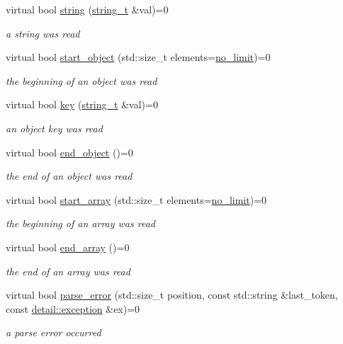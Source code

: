 \begin{DoxyCompactItemize}
virtual bool \mbox{\hyperlink{structnlohmann_1_1json__sax_a07eab82f6c82d606787eee9ad73d2bda}{string}} (\mbox{\hyperlink{structnlohmann_1_1json__sax_ae01977a9f3c5b3667b7a2929ed91061e}{string\+\_\+t}} \&val)=0
\begin{DoxyCompactList}\small\item\em a string was read \end{DoxyCompactList}\item 
virtual bool \mbox{\hyperlink{structnlohmann_1_1json__sax_a447db60efaabc614492c449e640719cf}{start\+\_\+object}} (std\+::size\+\_\+t elements=\mbox{\hyperlink{structnlohmann_1_1json__sax_a84031c6bbd5b85ec13da024fe9e2b9c9}{no\+\_\+limit}})=0
\begin{DoxyCompactList}\small\item\em the beginning of an object was read \end{DoxyCompactList}\item 
virtual bool \mbox{\hyperlink{structnlohmann_1_1json__sax_a2e0c7ecd80b18d18a8cc76f71cfc2028}{key}} (\mbox{\hyperlink{structnlohmann_1_1json__sax_ae01977a9f3c5b3667b7a2929ed91061e}{string\+\_\+t}} \&val)=0
\begin{DoxyCompactList}\small\item\em an object key was read \end{DoxyCompactList}\item 
virtual bool \mbox{\hyperlink{structnlohmann_1_1json__sax_ad0c722d53ff97be700ccf6a9468bd456}{end\+\_\+object}} ()=0
\begin{DoxyCompactList}\small\item\em the end of an object was read \end{DoxyCompactList}\item 
virtual bool \mbox{\hyperlink{structnlohmann_1_1json__sax_aa7717e96a46e41984260ebabab262369}{start\+\_\+array}} (std\+::size\+\_\+t elements=\mbox{\hyperlink{structnlohmann_1_1json__sax_a84031c6bbd5b85ec13da024fe9e2b9c9}{no\+\_\+limit}})=0
\begin{DoxyCompactList}\small\item\em the beginning of an array was read \end{DoxyCompactList}\item 
virtual bool \mbox{\hyperlink{structnlohmann_1_1json__sax_a235ee975617f28e6a996d1e36a282312}{end\+\_\+array}} ()=0
\begin{DoxyCompactList}\small\item\em the end of an array was read \end{DoxyCompactList}\item 
virtual bool \mbox{\hyperlink{structnlohmann_1_1json__sax_a60287e3bd85f489e04c83f7e3b76e613}{parse\+\_\+error}} (std\+::size\+\_\+t position, const std\+::string \&last\+\_\+token, const \mbox{\hyperlink{classnlohmann_1_1detail_1_1exception}{detail\+::exception}} \&ex)=0
\begin{DoxyCompactList}\small\item\em a parse error occurred \end{DoxyCompactList}\end{DoxyCompactItemize}
